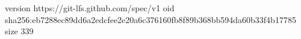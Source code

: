 version https://git-lfs.github.com/spec/v1
oid sha256:eb7288ec89dd6a2edcfee2e20a6c376160fb8f89b368bb594da60b33f4b17785
size 339
